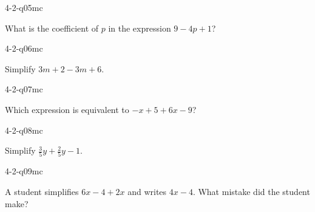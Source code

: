 \begin{practiceQuestion}{4-2-q05}{mc}
\begin{questionText}
What is the coefficient of $p$ in the expression $9 - 4p + 1$?
\end{questionText}
\end{practiceQuestion}

\begin{practiceQuestion}{4-2-q06}{mc}
\begin{questionText}
Simplify $3m + 2 - 3m + 6$.
\end{questionText}
\end{practiceQuestion}

\begin{practiceQuestion}{4-2-q07}{mc}
\begin{questionText}
Which expression is equivalent to $-x + 5 + 6x - 9$?
\end{questionText}
\end{practiceQuestion}

\begin{practiceQuestion}{4-2-q08}{mc}
\begin{questionText}
Simplify $\frac{3}{5}y + \frac{2}{5}y - 1$.
\end{questionText}
\end{practiceQuestion}

\begin{practiceQuestion}{4-2-q09}{mc}
\begin{questionText}
A student simplifies $6x - 4 + 2x$ and writes $4x - 4$. What mistake did the student make?
\end{questionText}
\end{practiceQuestion}

